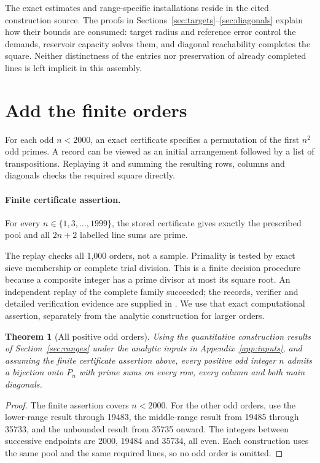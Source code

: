 \documentclass[11pt]{article}
\newtheorem{theorem}{Theorem}
\theoremstyle{definition}
\begin{document}
The exact estimates and range-specific installations reside in the cited
construction source. The proofs in Sections~\ref{sec:targets}--\ref{sec:diagonals}
explain how their bounds are consumed: target radius and reference error
control the demands, reservoir capacity solves them, and diagonal reachability
completes the square. Neither distinctness of the entries nor preservation of
already completed lines is left implicit in this assembly.

\section{Add the finite orders}\label{sec:allorders}

For each odd \(n<2000\), an exact certificate specifies a permutation of the
first \(n^2\) odd primes. A record can be viewed as an initial arrangement
followed by a list of transpositions. Replaying it and summing the resulting
rows, columns and diagonals checks the required square directly.

\paragraph{Finite certificate assertion.}
For every \(n\in\{1,3,\ldots,1999\}\), the stored certificate gives exactly
the prescribed pool and all \(2n+2\) labelled line sums are prime.

The replay checks all 1,000 orders, not a sample. Primality is tested by exact
sieve membership or complete trial division. This is a finite decision
procedure because a composite integer has a prime divisor at most its square
root. An independent replay of the complete family succeeded; the records,
verifier and detailed verification evidence are supplied in
\cite[Sections 6--7]{Companion}. We use that exact computational assertion,
separately from the analytic construction for larger orders.

\begin{theorem}[All positive odd orders]\label{thm:allodd}
Using the quantitative construction results of Section~\ref{sec:ranges} under
the analytic inputs in Appendix~\ref{app:inputs}, and assuming the finite
certificate assertion above, every positive odd integer \(n\) admits a
bijection onto \(P_n\) with prime sums on every row, every column and both
main diagonals.
\end{theorem}
\begin{proof}
The finite assertion covers \(n<2000\). For the other odd orders, use the
lower-range result through 19483, the middle-range result from 19485 through
35733, and the unbounded result from 35735 onward. The integers between
successive endpoints are 2000, 19484 and 35734, all even. Each construction
uses the same pool and the same required lines, so no odd order is omitted.
\end{proof}
\end{document}
